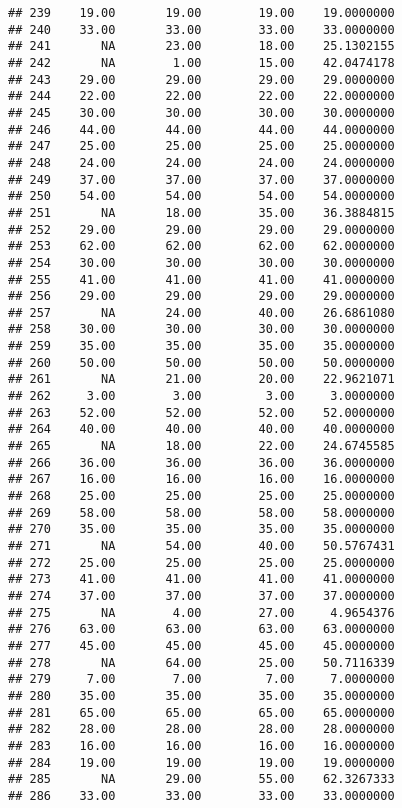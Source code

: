 \documentclass[
]{article}
\begin{document}
\begin{verbatim}
## 239    19.00       19.00        19.00    19.0000000
## 240    33.00       33.00        33.00    33.0000000
## 241       NA       23.00        18.00    25.1302155
## 242       NA        1.00        15.00    42.0474178
## 243    29.00       29.00        29.00    29.0000000
## 244    22.00       22.00        22.00    22.0000000
## 245    30.00       30.00        30.00    30.0000000
## 246    44.00       44.00        44.00    44.0000000
## 247    25.00       25.00        25.00    25.0000000
## 248    24.00       24.00        24.00    24.0000000
## 249    37.00       37.00        37.00    37.0000000
## 250    54.00       54.00        54.00    54.0000000
## 251       NA       18.00        35.00    36.3884815
## 252    29.00       29.00        29.00    29.0000000
## 253    62.00       62.00        62.00    62.0000000
## 254    30.00       30.00        30.00    30.0000000
## 255    41.00       41.00        41.00    41.0000000
## 256    29.00       29.00        29.00    29.0000000
## 257       NA       24.00        40.00    26.6861080
## 258    30.00       30.00        30.00    30.0000000
## 259    35.00       35.00        35.00    35.0000000
## 260    50.00       50.00        50.00    50.0000000
## 261       NA       21.00        20.00    22.9621071
## 262     3.00        3.00         3.00     3.0000000
## 263    52.00       52.00        52.00    52.0000000
## 264    40.00       40.00        40.00    40.0000000
## 265       NA       18.00        22.00    24.6745585
## 266    36.00       36.00        36.00    36.0000000
## 267    16.00       16.00        16.00    16.0000000
## 268    25.00       25.00        25.00    25.0000000
## 269    58.00       58.00        58.00    58.0000000
## 270    35.00       35.00        35.00    35.0000000
## 271       NA       54.00        40.00    50.5767431
## 272    25.00       25.00        25.00    25.0000000
## 273    41.00       41.00        41.00    41.0000000
## 274    37.00       37.00        37.00    37.0000000
## 275       NA        4.00        27.00     4.9654376
## 276    63.00       63.00        63.00    63.0000000
## 277    45.00       45.00        45.00    45.0000000
## 278       NA       64.00        25.00    50.7116339
## 279     7.00        7.00         7.00     7.0000000
## 280    35.00       35.00        35.00    35.0000000
## 281    65.00       65.00        65.00    65.0000000
## 282    28.00       28.00        28.00    28.0000000
## 283    16.00       16.00        16.00    16.0000000
## 284    19.00       19.00        19.00    19.0000000
## 285       NA       29.00        55.00    62.3267333
## 286    33.00       33.00        33.00    33.0000000

\end{verbatim}
\end{document}
